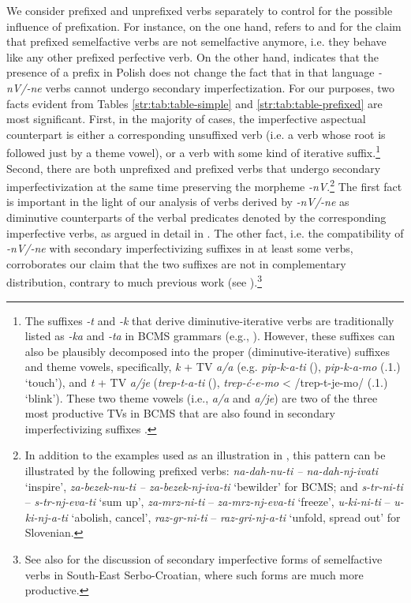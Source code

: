 \documentclass[output=paper,colorlinks,citecolor=brown]{langscibook}
\begin{document}
We consider prefixed and unprefixed verbs separately to control for the possible influence of prefixation. For instance, on the one hand, \citet{sta+:Biskup2023} refers to \citet{Isacenko1962} and \citet{Townsend1968} for the claim that prefixed semelfactive verbs are not semelfactive anymore, i.e. they behave like any other prefixed perfective verb. On the other hand, \citet{Kwapiszewski2022} indicates that the presence of a prefix in Polish does not change the fact that in that language \textit{-nV/-ne} verbs cannot undergo secondary imperfectization. For our purposes, two facts evident from Tables \ref{str:tab:table-simple} and \ref{str:tab:table-prefixed} are most significant. First, in the majority of cases, the imperfective aspectual counterpart is either a corresponding unsuffixed verb (i.e. a verb whose root is followed just by a theme vowel), or a verb with some kind of iterative suffix.\footnote{The suffixes \textit{-t} and \textit{-k} that derive diminutive-iterative verbs are traditionally listed as \textit{-ka} and \textit{-ta} in BCMS grammars (e.g., \citealt{StanojcicPopovic2008}). However, these suffixes can also be plausibly decomposed into the proper (diminutive-iterative) suffixes and theme vowels, specifically, \textit{k} + TV \textit{a/a} (e.g. \textit{pip-k-a-ti} ({\INF}), \textit{pip-k-a-mo} ({\PRS.1.\PL}) `touch'), and \textit{t} + TV \textit{a/je} (\textit{trep-t-a-ti} ({\INF}),\textit{ trep-ć-e-mo} < /trep-t-je-mo/ ({\PRS.1.\PL}) `blink'). These two theme vowels (i.e., \textit{a/a} and \textit{a/je}) are two of the three most productive TVs in BCMS that are also found in secondary imperfectivizing suffixes \citep{SimonovicEtAl2021, ArsenijevicEtAl2023}.}
Second, there are both unprefixed and prefixed verbs that undergo secondary imperfectivization at the same time preserving the morpheme \textit{-nV}.\footnote{In addition to the examples used as an illustration in , this pattern can be illustrated by the following prefixed verbs: \textit{na-dah-nu-ti -- na-dah-nj-ivati} `inspire', \textit{za-bezek-nu-ti -- za-bezek-nj-iva-ti} `bewilder' for BCMS; and \textit{s-tr-ni-ti} -- \textit{s-tr-nj-eva-ti} `sum up', \textit{za-mrz-ni-ti} -- \textit{za-mrz-nj-eva-ti} `freeze', \textit{u-ki-ni-ti} -- \textit{u-ki-nj-a-ti} `abolish, cancel', \textit{raz-gr-ni-ti} -- \textit{raz-gri-nj-a-ti} `unfold, spread out' for Slovenian.} The first fact is important in the light of our analysis of verbs derived by \textit{-nV/-ne} as diminutive counterparts of the verbal predicates denoted by the corresponding imperfective verbs, as argued in detail in . The other fact, i.e. the compatibility of \textit{-nV/-ne} with secondary imperfectivizing suffixes in at least some verbs, corroborates our claim that the two suffixes are not in complementary distribution, contrary to much previous work (see ).\footnote{See also \citet{Milosavljevic2023PhD} for the discussion of secondary imperfective forms of semelfactive verbs in South-East Serbo-Croatian, where such forms are much more productive.}   
\end{document}

